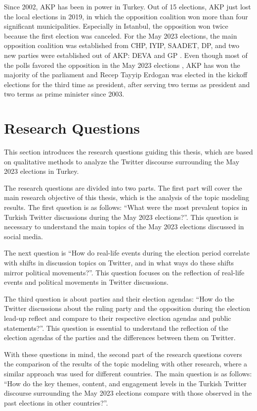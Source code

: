 Since 2002, \ac{AKP} has been in power in Turkey. Out of 15 elections, \ac{AKP} just lost the 
local elections in 2019, in which the opposition coalition won more than four significant municipalities. 
Especially in Istanbul, the opposition won twice because the first election was canceled. 
For the May 2023 elections, the main opposition coalition was established from \ac{CHP}, \ac{IYIP}, \ac{SAADET}, 
\ac{DP}, and two new parties were established out of \ac{AKP}: \ac{DEVA} and \ac{GP} 
\parencite{Atila_medyascope_tr_secim_tarihi_2022}. 
Even though most of the polls favored the opposition in the May 2023 elections 
\parencite{Saç_Çoban_teyit_anketler_2023}, \ac{AKP} has won the majority of the parliament and 
Recep Tayyip Erdogan was elected in the kickoff elections for the third time as president, after serving 
two terms as president and two terms as prime minister since 2003.


\section{Research Questions}

This section introduces the research questions guiding this thesis,
which are based on qualitative methods to analyze the Twitter discourse surrounding the May 2023 elections in Turkey.


The research questions are divided into two parts.
The first part will cover the main research objective of this thesis, 
which is the analysis of the topic modeling results. The first question is as follows:
``What were the most prevalent topics in Turkish Twitter discussions during the May 2023 elections?''.
This question is necessary to understand the main topics of the May 2023 elections discussed in social media.

The next question is ``How do real-life events during the election period correlate with shifts in discussion topics on Twitter, 
and in what ways do these shifts mirror political movements?''.
This question focuses on the reflection of real-life events and political movements in Twitter discussions. 

The third question is about parties and their election agendas: 
``How do the Twitter discussions about the ruling party and the opposition during the election lead-up reflect and compare 
to their respective election agendas and public statements?''.
This question is essential to understand the reflection of the election agendas of the parties and the differences between them on Twitter.

With these questions in mind, the second part of the research questions covers the comparison of the results of the topic modeling
with other research, where a similar approach was used for different countries.
The main question is as follows: 
``How do the key themes, content, and engagement levels in the Turkish Twitter discourse surrounding the May 2023 elections
 compare with those observed in the past elections in other countries?''.
